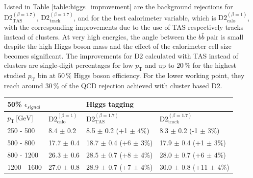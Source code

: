 Listed in Table \ref{table:higgs_improvement} are the background rejections for $\text{D2}_{\text{TAS}}^{(\beta=1.7)}$, $\text{D2}_{\text{track}}^{(\beta=1.7)}$, and for the best calorimeter variable, which is $\text{D2}_{\text{calo}}^{(\beta=1)}$, with the corresponding improvements due to the use of TAS respectively tracks instead of clusters. At very high energies, the angle between the $b\bar{b}$ pair is small despite the high Higgs boson mass and the effect of the calorimeter cell size becomes significant. The improvements for D2 calculated with TAS instead of clusters are single-digit percentages for low $p_{\mathrm{T}}$ and up to $20\,\%$ for the highest studied $p_{\mathrm{T}}$ bin at $50\,\%$ Higgs boson efficiency. For the lower working point, they reach around $30\,\%$ of the QCD rejection achieved with cluster based D2.
\begin{table}[]
\centering
\begin{tabular}{llll}
 \multicolumn{1}{l||}{\textbf{50\% $\epsilon_{signal}$}} &                                                &  \textbf{Higgs tagging}                                        &                                          \\ \hline
\multicolumn{1}{l||}{$p_{\mathrm{T}} \, \text{[GeV]}$}           & \multicolumn{1}{l|}{$\text{D2}_{\text{calo}}^{(\beta=1)}$} & \multicolumn{1}{l|}{$\text{D2}_{\text{TAS}}^{(\beta=1.7)}$} & \multicolumn{1}{l|}{$\text{D2}_{\text{track}}^{(\beta=1.7)}$} \\ \hline \hline
\multicolumn{1}{l||}{250 - 500}                       & \multicolumn{1}{l|}{8.4 $\pm$ 0.2}                      & \multicolumn{1}{l|}{8.5 $\pm$ 0.2 (+1 $\pm$ 4\%)}          & \multicolumn{1}{l|}{8.3 $\pm$ 0.2 (-1 $\pm$ 3\%)}        \\
\multicolumn{1}{l||}{500 - 800}                       & \multicolumn{1}{l|}{17.7 $\pm$ 0.4}                      & \multicolumn{1}{l|}{18.7 $\pm$ 0.4 (+6 $\pm$ 3\%)}        & \multicolumn{1}{l|}{17.9 $\pm$ 0.4 (+1 $\pm$ 3\%)}         \\
\multicolumn{1}{l||}{800 - 1200}                      & \multicolumn{1}{l|}{26.3 $\pm$ 0.6}                      & \multicolumn{1}{l|}{28.5 $\pm$ 0.7 (+8 $\pm$ 4\%)}        & \multicolumn{1}{l|}{28.0 $\pm$ 0.7 (+6 $\pm$ 4\%)}        \\
\multicolumn{1}{l||}{1200 - 1600}                     & \multicolumn{1}{l|}{27.0 $\pm$ 0.8}                      & \multicolumn{1}{l|}{28.9 $\pm$ 0.7 (+7 $\pm$ 4\%)}        & \multicolumn{1}{l|}{30.0 $\pm$ 0.8 (+11 $\pm$ 4\%)}        \\

\end{tabular}
\end{table}
